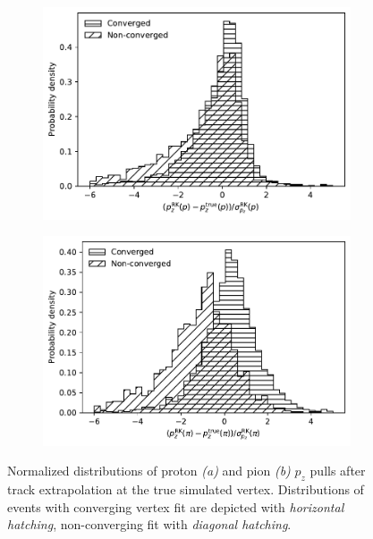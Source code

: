 \begin{figure}[t]
	\centering
	\begin{subfigure}{.45\textwidth}
		\includegraphics[width=\textwidth]{graphics/03-vertex_reconstruction/NONCONVERGED_p_momentum_residual_2Dv3D_z_rel.pdf}
		\caption{}
		\label{fig:p_momentum_residual_2Dv3D_z_rel}
	\end{subfigure}
	\begin{subfigure}{.45\textwidth}
		\includegraphics[width=\textwidth]{graphics/03-vertex_reconstruction/NONCONVERGED_pim_momentum_residual_2Dv3D_z_rel.pdf}
		\caption{}
		\label{fig:pim_momentum_residual_2Dv3D_z_rel}
	\end{subfigure}
	\caption{Normalized distributions of proton \textit{(a)} and pion \textit{(b)} $p_z$ pulls after track extrapolation at the true simulated \lambdadecay vertex. Distributions of events with converging vertex fit are depicted with \textit{horizontal hatching}, non-converging fit with \textit{diagonal hatching}.}
	\label{fig:p_pim_momentum_residual_2Dv3D_z_rel}
\end{figure}

